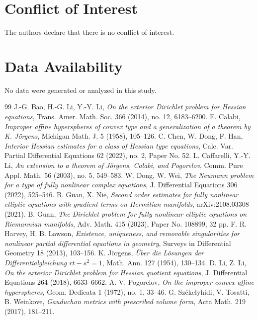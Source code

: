\documentclass[reqno,a4paper]{amsart}
\numberwithin{equation}{section}
\begin{document}
	\section*{Conflict of Interest}
	The authors declare that there is no conflict of interest.
	
	
	\section*{Data Availability}
	No data were generated or analyzed in this study.
	
	\begin{thebibliography}{99}
		 J.-G. Bao, H.-G. Li, Y.-Y. Li, \emph{On the exterior Dirichlet problem for Hessian equations}, Trans. Amer. Math. Soc. 366 (2014), no. 12, 6183--6200.
		 E. Calabi, \emph{Improper affine hyperspheres of convex type and a generalization of a theorem by K. J\"orgens}, Michigan Math. J. 5 (1958), 105--126.
		 C. Chen, W. Dong, F. Han, \emph{Interior Hessian estimates for a class of Hessian type equations}, Calc. Var. Partial Differential Equations 62 (2022), no. 2, Paper No. 52.
		 L. Caffarelli, Y.-Y. Li, \emph{An extension to a theorem of J\"orgens, Calabi, and Pogorelov}, Comm. Pure Appl. Math. 56 (2003), no. 5, 549--583.
		 W. Dong, W. Wei, \emph{The Neumann problem for a type of fully nonlinear complex equations}, J. Differential Equations 306 (2022), 525--546.
		 B. Guan, X. Nie, \emph{Second order estimates for fully nonlinear elliptic equations with gradient terms on Hermitian manifolds}, arXiv:2108.03308 (2021).
		 B. Guan, \emph{The Dirichlet problem for fully nonlinear elliptic equations on Riemannian manifolds}, Adv. Math. 415 (2023), Paper No. 108899, 32 pp.
		 F. R. Harvey, H. B. Lawson, \emph{Existence, uniqueness, and removable singularities for nonlinear partial differential equations in geometry}, Surveys in Differential Geometry 18 (2013), 103--156.
		 K. J\"orgens, \emph{\"Uber die L\"osungen der Differentialgleichung $rt - s^2 = 1$}, Math. Ann. 127 (1954), 130--134.
		 D. Li, Z. Li, \emph{On the exterior Dirichlet problem for Hessian quotient equations}, J. Differential Equations 264 (2018), 6633--6662.
		 A. V. Pogorelov, \emph{On the improper convex affine hyperspheres}, Geom. Dedicata 1 (1972), no. 1, 33--46.
		 G. Sz\'ekelyhidi, V. Tosatti, B. Weinkove, \emph{Gauduchon metrics with prescribed volume form}, Acta Math. 219 (2017), 181--211.

\end{thebibliography}
\end{document}
